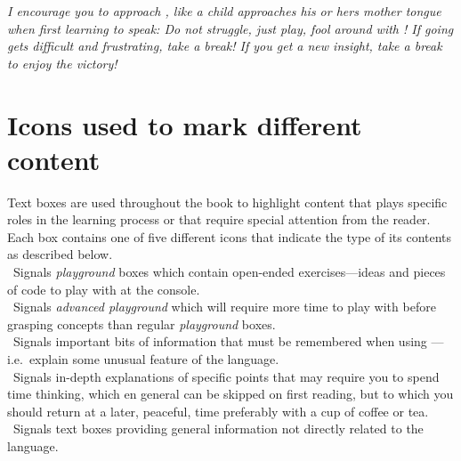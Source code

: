 \emph{I encourage you to approach \Rlang, like a child approaches his or hers mother tongue when first learning to speak: Do not struggle, just play, fool around with \Rlang! If going gets difficult and frustrating, take a break! If you get a new insight, take a break to enjoy the victory!
}%

\newpage
\noindent
\section*{Icons used to mark different content}

Text boxes are used throughout the book to highlight content that plays specific roles in the learning process or that require special attention from the reader. Each box contains one of five different icons that indicate the type of its contents as described below.\\[1.5ex]

\noindent
\playicon\ Signals \emph{playground} boxes which contain open-ended exercises---ideas and pieces of \Rlang code to play with at the \Rlang console.\\[1.5ex]

\noindent
\advplayicon\ Signals \emph{advanced playground} which will require more time to play with before grasping concepts than regular \emph{playground} boxes.\\[1.5ex]

\noindent
\ilAttention\ Signals important bits of information that must be remembered when using \Rlang---i.e.\ explain some unusual feature of the language.\\[1.5ex]

\noindent
\ilAdvanced\ Signals in-depth explanations of specific points that may require you to spend time thinking, which en general can be skipped on first reading, but to which you should return at a later, peaceful, time preferably with a cup of coffee or tea.\\[1.5ex]

\noindent
\infoicon\ Signals text boxes providing general information not directly related to the \Rlang language.\\[1.5ex]

